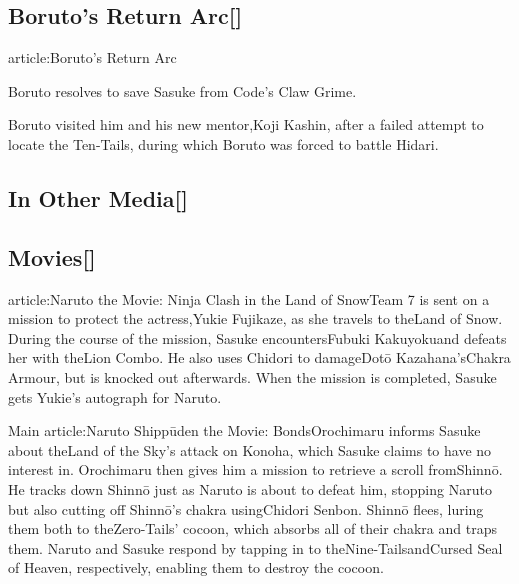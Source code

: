 \documentclass[a4paper,12pt]{article}
\begin{document}
\subsection*{Boruto's Return Arc[]}\n\nMain article:Boruto's Return Arc\\ \par \vspace{0.5cm}

Boruto resolves to save Sasuke from Code's Claw Grime.\\ \par \vspace{0.5cm}

Boruto visited him and his new mentor,Koji Kashin, after a failed attempt to locate the Ten-Tails, during which Boruto was forced to battle Hidari.\\ \par \vspace{0.5cm}

\subsection*{In Other Media[]}\n\n\subsection*{Movies[]}\n\nMain article:Naruto the Movie: Ninja Clash in the Land of SnowTeam 7 is sent on a mission to protect the actress,Yukie Fujikaze, as she travels to theLand of Snow. During the course of the mission, Sasuke encountersFubuki Kakuyokuand defeats her with theLion Combo. He also uses Chidori to damageDotō Kazahana'sChakra Armour, but is knocked out afterwards. When the mission is completed, Sasuke gets Yukie's autograph for Naruto.\\ \par \vspace{0.5cm}

Main article:Naruto Shippūden the Movie: BondsOrochimaru informs Sasuke about theLand of the Sky's attack on Konoha, which Sasuke claims to have no interest in. Orochimaru then gives him a mission to retrieve a scroll fromShinnō. He tracks down Shinnō just as Naruto is about to defeat him, stopping Naruto but also cutting off Shinnō's chakra usingChidori Senbon. Shinnō flees, luring them both to theZero-Tails' cocoon, which absorbs all of their chakra and traps them. Naruto and Sasuke respond by tapping in to theNine-TailsandCursed Seal of Heaven, respectively, enabling them to destroy the cocoon.\\ \par \vspace{0.5cm}
\end{document}

